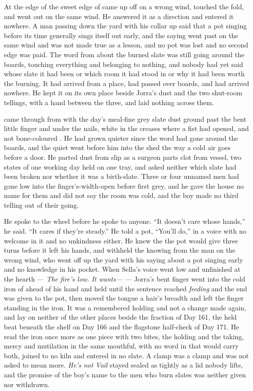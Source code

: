 At the edge of  the sweet edge of  came up off  on a wrong wind, touched the fold, and went out on the same wind. He answered it as a direction and entered it nowhere. A man passing down the yard with his collar up said that a pot singing before its time generally sings itself out early, and the saying went past on the same wind and was not made true as a lesson, and no pot was lost and no second edge was paid. The word from  about the burned slate was still going around the boards, touching everything and belonging to nothing, and nobody had yet said whose slate it had been or which room it had stood in or why it had been worth the burning. It had arrived from a place, had passed over boards, and had arrived nowhere. He kept it on its own place beside Jorra's dust and the two shut-room tellings, with a hand between the three, and laid nothing across them.

 came through from  with the day's meal-fine grey slate dust ground past the bent little finger and under the nails, white in the creases where a fist had opened, and not bone-coloured . He had grown quieter since the word had gone around the boards, and the quiet went before him into the shed the way a cold air goes before a door. He parted dust from slip as a surgeon parts clot from vessel, two states of one working day held on one tray, and asked neither which slate had been broken nor whether it was a birth-slate. Three or four unnamed men had gone low into the finger's-width-open  before first grey, and he gave the house no name for them and did not say the room was cold, and the boy made no third telling out of their going.

He spoke to the wheel before he spoke to anyone. “It doesn't care whose hands,” he said. “It cares if they're steady.” He told a pot, “You'll do,” in a voice with no welcome in it and no unkindness either. He knew the  the pot would give three turns before it left his hands, and withheld the knowing from the man on the wrong wind, who went off up the yard with his saying about a pot singing early and no knowledge in his pocket. When Sella's voice went low and unfinished at the hearth --- \emph{The fire's low. It wants---} --- Jorra's bent finger went into the cold iron of  ahead of his hand and held until the sentence reached \emph{feeding} and the end was given to the pot, then moved the tongue a hair's breadth and left the finger standing in the iron. It was a remembered holding and not a change made again, and lay on neither of the other places beside the fraction of Day 161, the held beat beneath the shelf on Day 166 and the flagstone half-check of Day 171. He read the iron once more as one piece with two bites, the holding and the taking, mercy and mutilation in the same mouthful, with no word in  that would carry both, joined to no kiln and entered in no slate. A clamp was a clamp and was not asked to mean more. \emph{He's not Vail} stayed sealed as tightly as a lid nobody lifts, and the promise of the boy's name to the men who burn slates was neither given nor withdrawn.

